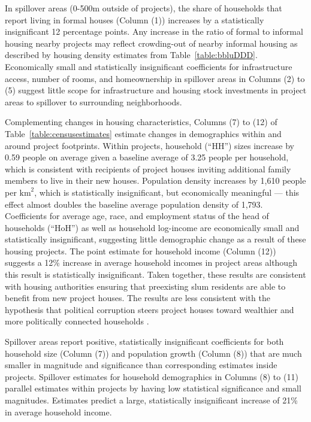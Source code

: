 \documentclass[12pt]{article}
\begin{document}
In spillover areas (0-500m outside of projects), the share of households that report living in formal houses (Column (1)) increases by a statistically insignificant 12 percentage points.  Any increase in the ratio of formal to informal housing nearby projects may reflect crowding-out of nearby informal housing as described by housing density estimates from Table~\ref{table:bbluDDD}.  Economically small and statistically insignificant coefficients for infrastructure access, number of rooms, and homeownership in spillover areas in Columns (2) to (5) suggest little scope for infrastructure and housing stock investments in project areas to spillover to surrounding neighborhoods.

Complementing changes in housing characteristics, Columns (7) to (12) of Table~\ref{table:censusestimates} estimate changes in demographics within and around project footprints.  Within projects, household (``HH'') sizes increase by 0.59 people on average given a baseline average of 3.25 people per household, which is consistent with recipients of project houses inviting additional family members to live in their new houses.  Population density increases by 1,610 people per $\text{km}^{2}$, which is statistically insignificant, but economically meaningful --- this effect almost doubles the baseline average population density of 1,793.  Coefficients for average age, race, and employment status of the head of households (``HoH'') as well as household log-income are economically small and statistically insignificant, suggesting little demographic change as a result of these housing projects.  The point estimate for household income (Column (12)) suggests a 12\% increase in average household incomes in project areas although this result is statistically insignificant.  Taken together, these results are consistent with housing authorities ensuring that preexisting slum residents are able to benefit from new project houses.  The results are less consistent with the hypothesis that political corruption steers project houses toward wealthier and more politically connected households \citep{seriq}.  %

Spillover areas report positive, statistically insignificant coefficients for both household size (Column (7)) and population growth (Column (8)) that are much smaller in magnitude and significance than corresponding estimates inside projects.  Spillover estimates for household demographics in Columns (8) to (11) parallel estimates within projects by having low statistical significance and small magnitudes.  Estimates predict a large, statistically insignificant increase of 21\% in average household income.
\end{document}
